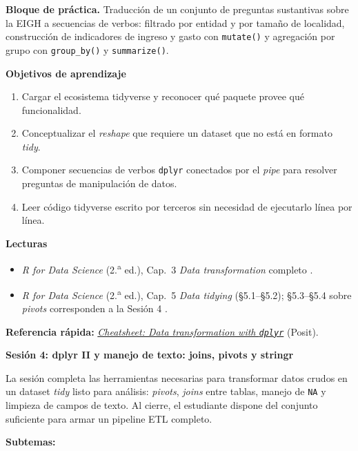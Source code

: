 \documentclass[11pt,letterpaper]{article}
\newcommand{\orange}[1]{{\color{redorange}#1}}
\newcommand{\sesion}[2]{%
  \bigskip%
  {\color{main}\Large\bfseries Sesión #1: #2\par}%
  \smallskip%
}
\newcommand{\practica}[1]{%
  \medskip\noindent\textbf{\orange{Bloque de práctica.}} #1\par%
}
\newcommand{\cheatsheet}[2]{%
  \href{https://rstudio.github.io/cheatsheets/#1.pdf}{\textit{Cheatsheet: #2}}%
}
\begin{document}
\practica{Traducción de un conjunto de preguntas sustantivas sobre la EIGH a secuencias de verbos: filtrado por entidad y por tamaño de localidad, construcción de indicadores de ingreso y gasto con \texttt{mutate()} y agregación por grupo con \texttt{group\_by()} y \texttt{summarize()}.}

\medskip
\noindent\textbf{Objetivos de aprendizaje}
\begin{enumerate}[leftmargin=*, itemsep=1pt]
    \item Cargar el ecosistema tidyverse y reconocer qué paquete provee qué funcionalidad.
    \item Conceptualizar el \textit{reshape} que requiere un dataset que no está en formato \textit{tidy}.
    \item Componer secuencias de verbos \texttt{dplyr} conectados por el \textit{pipe} para resolver preguntas de manipulación de datos.
    \item Leer código tidyverse escrito por terceros sin necesidad de ejecutarlo línea por línea.
\end{enumerate}

\medskip
\noindent\textbf{Lecturas}
\begin{itemize}[leftmargin=*, itemsep=1pt]
    \item \textit{R for Data Science} (2.\textsuperscript{a} ed.), Cap.\ 3 \textit{Data transformation} completo \cite{wickham2023r4ds}.
    \item \textit{R for Data Science} (2.\textsuperscript{a} ed.), Cap.\ 5 \textit{Data tidying} (§5.1--§5.2); §5.3--§5.4 sobre \textit{pivots} corresponden a la Sesión 4 \cite{wickham2023r4ds}.
\end{itemize}

\medskip
\noindent\textbf{Referencia rápida:} \cheatsheet{data-transformation}{Data transformation with \texttt{dplyr}} (Posit).

\sesion{4}{dplyr II y manejo de texto: joins, pivots y stringr}

La sesión completa las herramientas necesarias para transformar datos crudos en un dataset \textit{tidy} listo para análisis: \textit{pivots}, \textit{joins} entre tablas, manejo de \texttt{NA} y limpieza de campos de texto. Al cierre, el estudiante dispone del conjunto suficiente para armar un pipeline ETL completo.

\textbf{Subtemas:}
\end{document}
